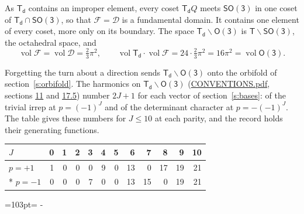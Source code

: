 \documentclass[10pt,a4paper]{article}
\newcommand{\needspace}[1]{\par\penalty-100\begingroup\dimen0=#1\relax\dimen2=\pagegoal
  \advance\dimen2-\pagetotal\ifdim\dimen0>\dimen2\relax\ifdim\dimen2>0pt\vfil\break\fi\fi
  \endgroup}
\numberwithin{equation}{section}
\newcommand{\grp}[1]{\mathsf{#1}}
\newcommand{\vol}{\operatorname{vol}}
\newcommand{\fcell}{\mathcal{D}}
\newcommand{\fdomain}{\mathcal{F}}
\begin{document}
\leavevmode\label{n:set.fundamental}As $\grp{T_{d}}$ contains an improper element, every coset $\grp{T_{d}}Q$ meets \href{SO3.pdf}{$\grp{SO(3)}$} in one coset of $\grp{T_{d}} \cap \grp{SO(3)}$, so that $\fdomain = \fcell$ is a fundamental domain. It contains one element of every coset, more only on its boundary.
The space $\grp{T_{d}}\backslash\grp{O(3)}$ is $\grp{T}\backslash\grp{SO(3)}$, the octahedral space, and
\begin{equation}\label{e:volume}\vol\fdomain = \vol\fcell = \tfrac{2}{3}\pi^2,\qquad \vol\grp{T_{d}}\cdot\vol\fdomain = 24\cdot \tfrac{2}{3}\pi^2 = 16\pi^2 = \vol\grp{O(3)}.\end{equation}

Forgetting the turn about a direction sends $\grp{T_{d}}\backslash\grp{O(3)}$ onto the orbifold of section~\ref{s:orbifold}.
The harmonics on $\grp{T_{d}}\backslash\grp{O(3)}$ (\href{../../CONVENTIONS.pdf}{CONVENTIONS.pdf}, sections \href{../../CONVENTIONS.pdf\#conv.11}{11} and \href{../../CONVENTIONS.pdf\#conv.17.5}{17.5}) number $2J + 1$ for each vector of section~\ref{s:bases}: of the trivial irrep at $p = (-1)^J$ and of the determinant character at $p = -(-1)^J$. The table gives these numbers for $J \le 10$ at each parity, and the record holds their generating functions.
{\small\setlength{\tabcolsep}{4pt}\begin{longtable}{@{}lrrrrrrrrrrr@{}}\toprule
$J$ & 0 & 1 & 2 & 3 & 4 & 5 & 6 & 7 & 8 & 9 & 10\\\midrule\endhead
\bottomrule\endfoot\endlastfoot
$p = +1$ & 1 & 0 & 0 & 0 & 9 & 0 & 13 & 0 & 17 & 19 & 21\\*
$p = -1$ & 0 & 0 & 0 & 7 & 0 & 0 & 13 & 15 & 0 & 19 & 21\\
\bottomrule\end{longtable}}
\needspace{103pt}
\end{document}
